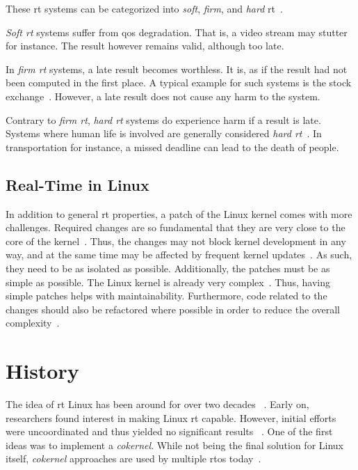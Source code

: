 \documentclass[10pt,twocolumn,a4paper]{article}
\begin{document}
These \acrshort{rt} systems can be categorized into \emph{soft}, \emph{firm}, and \emph{hard} \acrshort{rt}~\cite{buttazzo_hard_1997}.

\emph{Soft \acrshort{rt}} systems suffer from \acrfull{qos} degradation.
That is, a video stream may stutter for instance.
The result however remains valid, although too late.

In \emph{firm \acrshort{rt}} systems, a late result becomes worthless.
It is, as if the result had not been computed in the first place.
A typical example for such systems is the stock exchange~\cite{reghenzani_realtime_2019}.
However, a late result does not cause any harm to the system.

Contrary to \emph{firm \acrshort{rt}}, \emph{hard \acrshort{rt}} systems do experience harm if a result is late.
Systems where human life is involved are generally considered \emph{hard \acrshort{rt}}~\cite{reghenzani_realtime_2019}.
In transportation for instance, a missed deadline can lead to the death of people.

\subsection{Real-Time in Linux}
In addition to general \acrshort{rt} properties, a patch of the Linux kernel comes with more challenges.
Required changes are so fundamental that they are very close to the core of the kernel~\cite{perlow_trenches_2021}.
Thus, the changes may not block kernel development in any way, and at the same time may be affected by frequent kernel updates~\cite{perlow_trenches_2021}.
As such, they need to be as isolated as possible.
Additionally, the patches must be as simple as possible.
The Linux kernel is already very complex~\cite{shulyupin_linux_map_2025}.
Thus, having simple patches helps with maintainability.
Furthermore, code related to the changes should also be refactored where possible in order to reduce the overall complexity~\cite{perlow_trenches_2021}.


\section{History}\label{sec:history}
The idea of \acrshort{rt} Linux has been around for over two decades ~\cite{casimiro_how_2000}.
Early on, researchers found interest in making Linux \acrshort{rt} capable.
However, initial efforts were uncoordinated and thus yielded no significant results ~\cite{perlow_trenches_2021}.
One of the first ideas was to implement a \emph{cokernel}.
While not being the final solution for Linux itself, \emph{cokernel} approaches are used by multiple \acrshort{rtos} today~\cite{reghenzani_realtime_2019}.
\end{document}
